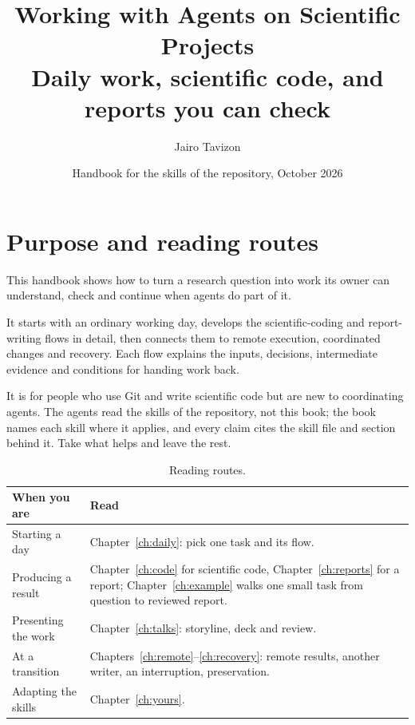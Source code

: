 \documentclass[11pt,a4paper,oneside,openany]{book}
\title{\textbf{Working with Agents on Scientific Projects}\\[0.4em]
 \large Daily work, scientific code, and reports you can check}
\author{Jairo Tavizon}
\date{Handbook for the skills of the repository, October 2026}
\begin{document}
\frontmatter
\pagestyle{plain}
\hypersetup{pageanchor=false}
\maketitle
\hypersetup{pageanchor=true}
\chapter*{Purpose and reading routes}

\begin{headline}
  This handbook shows how to turn a research question into work its owner can understand,
  check and continue when agents do part of it.
\end{headline}

It starts with an ordinary working day, develops the scientific-coding and report-writing
flows in detail, then connects them to remote execution, coordinated changes and
recovery. Each flow explains the inputs, decisions, intermediate evidence and conditions
for handing work back.

It is for people who use Git and write scientific code but are new to coordinating
agents. The agents read the skills of the repository, not this book; the book names each
skill where it applies, and every claim cites the skill file and section behind it. Take
what helps and leave the rest.

\begin{table}[H]
  \small
  \begin{tabularx}{\textwidth}{L{0.3\textwidth}Y}
    \toprule
    When you are & Read \\
    \midrule
    Starting a day & Chapter~\ref{ch:daily}: pick one task and its flow. \\
    Producing a result & Chapter~\ref{ch:code} for scientific code,
    Chapter~\ref{ch:reports} for a report; Chapter~\ref{ch:example} walks one small task
    from question to reviewed report. \\
    Presenting the work & Chapter~\ref{ch:talks}: storyline, deck and review. \\
    At a transition & Chapters~\ref{ch:remote}--\ref{ch:recovery}: remote results, another
    writer, an interruption, preservation. \\
    Adapting the skills & Chapter~\ref{ch:yours}. \\
    \bottomrule
  \end{tabularx}
  \caption{Reading routes.}
  \label{tab:routes}
\end{table}
\end{document}
